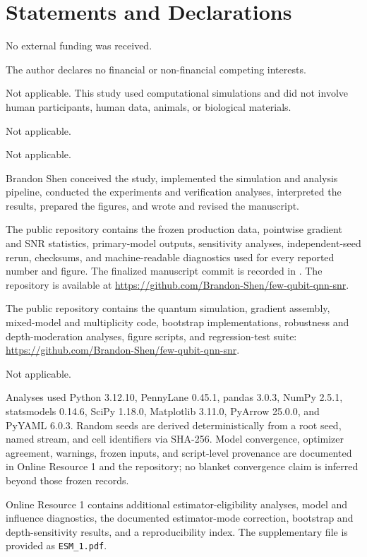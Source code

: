 \documentclass[pdflatex,sn-basic,Numbered]{sn-jnl}
\newcommand{\ttf}[1]{\texttt{\seqsplit{#1}}}
\begin{document}
\backmatter

\section*{Statements and Declarations}

 No external funding was received.

 The author declares no financial or non-financial competing interests.

 Not applicable. This study used computational simulations and did not involve human participants, human data, animals, or biological materials.

 Not applicable.

 Not applicable.

 Brandon Shen conceived the study, implemented the simulation and analysis pipeline, conducted the experiments and verification analyses, interpreted the results, prepared the figures, and wrote and revised the manuscript.

 The public repository contains the frozen production data, pointwise gradient and SNR statistics, primary-model outputs, sensitivity analyses, independent-seed rerun, checksums, and machine-readable diagnostics used for every reported number and figure. The finalized manuscript commit is recorded in \ttf{MANUSCRIPT\_COMMIT.txt}. The repository is available at \url{https://github.com/Brandon-Shen/few-qubit-qnn-snr}.

 The public repository contains the quantum simulation, gradient assembly, mixed-model and multiplicity code, bootstrap implementations, robustness and depth-moderation analyses, figure scripts, and regression-test suite: \url{https://github.com/Brandon-Shen/few-qubit-qnn-snr}.

 Not applicable.

 Analyses used Python 3.12.10, PennyLane 0.45.1, pandas 3.0.3, NumPy 2.5.1, statsmodels 0.14.6, SciPy 1.18.0, Matplotlib 3.11.0, PyArrow 25.0.0, and PyYAML 6.0.3. Random seeds are derived deterministically from a root seed, named stream, and cell identifiers via SHA-256. Model convergence, optimizer agreement, warnings, frozen inputs, and script-level provenance are documented in Online Resource 1 and the repository; no blanket convergence claim is inferred beyond those frozen records.

 Online Resource 1 contains additional estimator-eligibility analyses, model and influence diagnostics, the documented estimator-mode correction, bootstrap and depth-sensitivity results, and a reproducibility index. The supplementary file is provided as \texttt{ESM\_1.pdf}.


\end{document}
